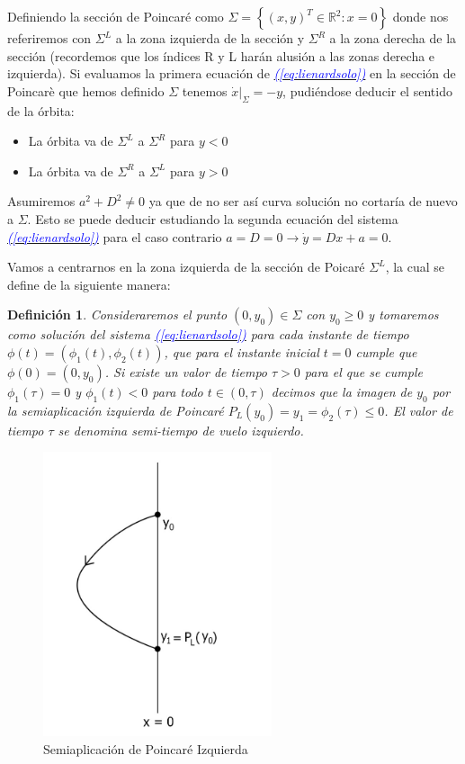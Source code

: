 \documentclass[12pt,a4paper]{report} %
\newtheorem{definicion}{Definición}[chapter] %
\newcommand{\eref}[1]{\hyperref[#1]{\textcolor{blue}{\textit{(\ref*{#1})}}}}
\begin{document}
	Definiendo la sección de Poincaré como $\varSigma=\left\{(x,y)^T\in \mathbb{R}^2:x=0\right\}$ donde nos referiremos con $\varSigma^L$ a la zona izquierda de la sección y $\varSigma^R$ a la zona derecha de la sección (recordemos que los índices R y L harán alusión a las zonas derecha e izquierda). Si evaluamos la primera ecuación de \eref{eq:lienardsolo} en la sección de Poincarè que hemos definido $\varSigma$ tenemos $\dot{x}|_{\varSigma}=-y$, pudiéndose deducir el sentido de la órbita:
	
	\begin{itemize}
		\item La órbita va de $\varSigma^L$ a $\varSigma^R$ para $y<0$
		\item La órbita va de $\varSigma^R$ a $\varSigma^L$ para $y>0$
	\end{itemize}
	
	Asumiremos $a^2+D^2\neq0$ ya que de no ser así curva solución no cortaría de nuevo a $\varSigma$. Esto se puede deducir estudiando la segunda ecuación del sistema \eref{eq:lienardsolo} para el caso contrario $a=D=0 \longrightarrow \dot{y}=Dx+a=0$.
	
	\vspace{0.5cm}Vamos a centrarnos en la zona izquierda de la sección de Poicaré $\varSigma^L$, la cual se define de la siguiente manera:

	\begin{definicion}
		\label{def6}
		Consideraremos el punto $(0,y_0)\in \varSigma$ con $y_0\geq0$ y tomaremos como solución del sistema \eref{eq:lienardsolo} para cada instante de tiempo $\phi(t)=(\phi_1(t),\phi_2(t))$, que para el instante inicial $t=0$ cumple que $\phi(0)=(0,y_0)$. Si existe un valor de tiempo $\tau>0$ para el que se cumple $\phi_1(\tau)=0$ y $\phi_1(t)<0$ para todo $t\in(0,\tau)$ decimos que la imagen de $y_0$ por la semiaplicación izquierda de Poincaré $P_L(y_0)=y_1=\phi_2(\tau)\leq0$. El valor de tiempo $\tau$ se denomina semi-tiempo de vuelo izquierdo.
	\end{definicion}
	
	\begin{figure}[h]
		\centering
		\includegraphics[width=0.6\textwidth]{semiL.jpg}
		\caption{ Semiaplicación de Poincaré Izquierda}
		\label{fig:semiL}
	\end{figure}\smallskip
	\newpage
	
\end{document}
